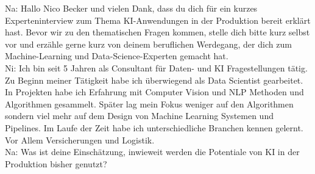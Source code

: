 \documentclass[a4paper,12pt, german]{report}
\begin{document}
Na: Hallo Nico Becker und vielen Dank, dass du dich für ein kurzes Experteninterview zum Thema KI-Anwendungen in der Produktion bereit erklärt hast. Bevor wir zu den thematischen Fragen kommen, stelle dich bitte kurz selbst vor und erzähle gerne kurz von deinem beruflichen Werdegang, der dich zum Machine-Learning und Data-Science-Experten gemacht hat.
\\

Ni: Ich bin seit 5 Jahren als Consultant für Daten- und KI Fragestellungen tätig. Zu Beginn meiner Tätigkeit habe ich überwiegend als Data Scientist gearbeitet. In Projekten habe ich Erfahrung mit Computer Vision und NLP Methoden und Algorithmen gesammelt. Später lag mein Fokus weniger auf den Algorithmen sondern viel mehr auf dem Design von Machine Learning Systemen und Pipelines. Im Laufe der Zeit habe ich unterschiedliche Branchen kennen gelernt. Vor Allem Versicherungen und Logistik.
\\

Na: Was ist deine Einschätzung, inwieweit werden die Potentiale von KI in der Produktion bisher genutzt?
\\
\end{document}
